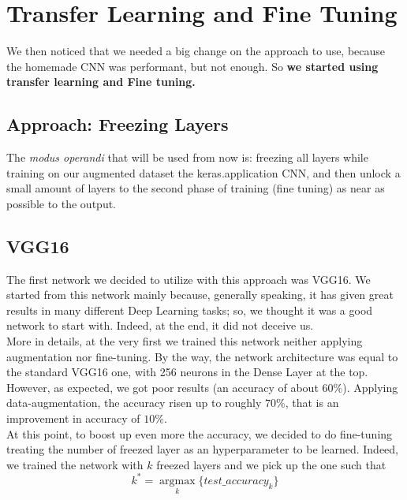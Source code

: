\documentclass[10pt]{article}
\begin{document}
\section{Transfer Learning and Fine Tuning}
We then noticed that we needed a big change on the approach to use, because the homemade
CNN was performant, but not enough. So \textbf{we started using transfer learning and Fine tuning.}

\subsection{Approach: Freezing Layers}
The \textit{modus operandi} that will be used from now is: freezing all layers while training on our augmented dataset the keras.application
CNN, and then unlock a small amount of layers to the second phase of training (fine tuning) as near as possible to the output.
\subsection{VGG16}
The first network we decided to utilize with this approach was VGG16. We started from this network mainly because, generally speaking, it has given great results in many different Deep Learning tasks; so, we thought it was a good network to start with. Indeed, at the end, it did not deceive us.\\[0.1cm] More in details, at the very first we trained this network neither applying augmentation nor fine-tuning. By the way, the network architecture was equal to the standard VGG16 one, with 256 neurons in the Dense Layer at the top. However, as expected, we got poor results (an accuracy of about $60\%$). Applying data-augmentation, the accuracy risen up to roughly $70\%$, that is an improvement in accuracy of $10\%$.\\[0.1cm]
At this point, to boost up even more the accuracy, we decided to do fine-tuning treating the number of freezed layer as an hyperparameter to be learned. Indeed, we trained the network with $k$ freezed layers and we pick up the one such that
\begin{equation*}
    k^* = \underset{k}{\operatorname{argmax}}\{test\_accuracy_{k}\}
\end{equation*}
\end{document}

